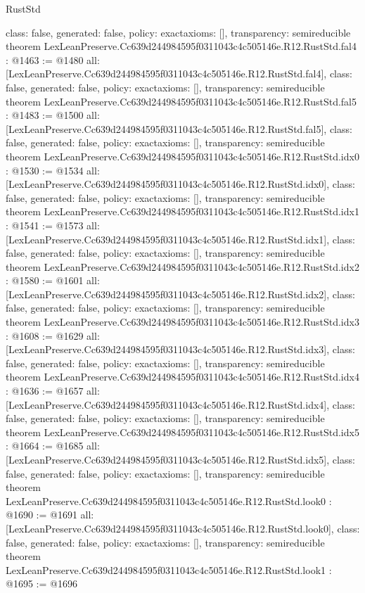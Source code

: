 \begin{lexlean}{RustStd}
\begin{coremodule}
{  class: false,
  generated: false,
  policy: exact{axioms: []},
  transparency: semireducible
}
theorem LexLeanPreserve.Cc639d244984595f0311043c4c505146e.R12.RustStd.fal4 : @1463 := @1480 {
  all: [LexLeanPreserve.Cc639d244984595f0311043c4c505146e.R12.RustStd.fal4],
  class: false,
  generated: false,
  policy: exact{axioms: []},
  transparency: semireducible
}
theorem LexLeanPreserve.Cc639d244984595f0311043c4c505146e.R12.RustStd.fal5 : @1483 := @1500 {
  all: [LexLeanPreserve.Cc639d244984595f0311043c4c505146e.R12.RustStd.fal5],
  class: false,
  generated: false,
  policy: exact{axioms: []},
  transparency: semireducible
}
theorem LexLeanPreserve.Cc639d244984595f0311043c4c505146e.R12.RustStd.idx0 : @1530 := @1534 {
  all: [LexLeanPreserve.Cc639d244984595f0311043c4c505146e.R12.RustStd.idx0],
  class: false,
  generated: false,
  policy: exact{axioms: []},
  transparency: semireducible
}
theorem LexLeanPreserve.Cc639d244984595f0311043c4c505146e.R12.RustStd.idx1 : @1541 := @1573 {
  all: [LexLeanPreserve.Cc639d244984595f0311043c4c505146e.R12.RustStd.idx1],
  class: false,
  generated: false,
  policy: exact{axioms: []},
  transparency: semireducible
}
theorem LexLeanPreserve.Cc639d244984595f0311043c4c505146e.R12.RustStd.idx2 : @1580 := @1601 {
  all: [LexLeanPreserve.Cc639d244984595f0311043c4c505146e.R12.RustStd.idx2],
  class: false,
  generated: false,
  policy: exact{axioms: []},
  transparency: semireducible
}
theorem LexLeanPreserve.Cc639d244984595f0311043c4c505146e.R12.RustStd.idx3 : @1608 := @1629 {
  all: [LexLeanPreserve.Cc639d244984595f0311043c4c505146e.R12.RustStd.idx3],
  class: false,
  generated: false,
  policy: exact{axioms: []},
  transparency: semireducible
}
theorem LexLeanPreserve.Cc639d244984595f0311043c4c505146e.R12.RustStd.idx4 : @1636 := @1657 {
  all: [LexLeanPreserve.Cc639d244984595f0311043c4c505146e.R12.RustStd.idx4],
  class: false,
  generated: false,
  policy: exact{axioms: []},
  transparency: semireducible
}
theorem LexLeanPreserve.Cc639d244984595f0311043c4c505146e.R12.RustStd.idx5 : @1664 := @1685 {
  all: [LexLeanPreserve.Cc639d244984595f0311043c4c505146e.R12.RustStd.idx5],
  class: false,
  generated: false,
  policy: exact{axioms: []},
  transparency: semireducible
}
theorem LexLeanPreserve.Cc639d244984595f0311043c4c505146e.R12.RustStd.look0 : @1690 := @1691 {
  all: [LexLeanPreserve.Cc639d244984595f0311043c4c505146e.R12.RustStd.look0],
  class: false,
  generated: false,
  policy: exact{axioms: []},
  transparency: semireducible
}
theorem LexLeanPreserve.Cc639d244984595f0311043c4c505146e.R12.RustStd.look1 : @1695 := @1696 {
}
\end{coremodule}
\end{lexlean}
